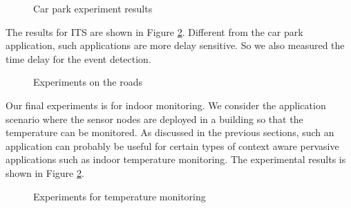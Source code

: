 \begin{figure}
\centering
{}
{}
\caption{Car park experiment results}
\label{fig:carParkResults}
\end{figure}

The results for ITS are shown in Figure \ref{fig:itsResults}. Different from the car park application, such applications are more delay sensitive. So we also measured the time delay for the event detection. %
 
\begin{figure}
\centering
{}
{}
\caption{Experiments on the roads}
\label{fig:itsResults}
\end{figure}

Our final experiments is for indoor monitoring. We consider the application scenario where the sensor nodes are deployed in a building so that the temperature can be monitored. As discussed in the previous sections, such an application can probably be useful for certain types of context aware pervasive applications such as indoor temperature monitoring. The experimental results is shown in Figure \ref{fig:itsResults}. 

\begin{figure}
\centering
{}
{}
\caption{Experiments for temperature monitoring}
\label{fig:indoorResult}
\end{figure}